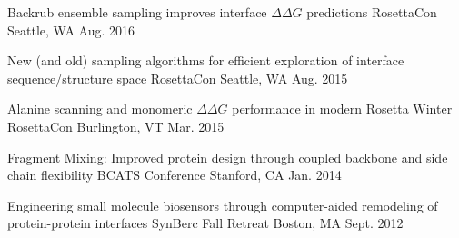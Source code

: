

\begin{cvhonors}

  \cvhonor
  {Backrub ensemble sampling improves interface $\Delta\Delta G$ predictions} %
  {RosettaCon} %
  {Seattle, WA} %
  {Aug. 2016} %

  \cvhonor
  {New (and old) sampling algorithms for efficient exploration of interface sequence/structure space} %
  {RosettaCon} %
  {Seattle, WA} %
  {Aug. 2015} %

  \cvhonor
  {Alanine scanning and monomeric $\Delta\Delta G$ performance in modern Rosetta} %
  {Winter RosettaCon} %
  {Burlington, VT} %
  {Mar. 2015} %

  \cvhonor
  {Fragment Mixing: Improved protein design through coupled backbone and side chain flexibility} %
  {BCATS Conference} %
  {Stanford, CA} %
  {Jan. 2014} %



  \cvhonor
  {Engineering small molecule biosensors through computer-aided remodeling of protein-protein interfaces} %
  {SynBerc Fall Retreat} %
  {Boston, MA} %
  {Sept. 2012} %

\end{cvhonors}
